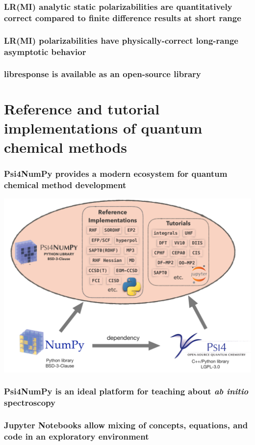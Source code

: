 \documentclass[%
    draft,%
    xcolor=usenames,dvipsnames,svgnames%
]{beamer}
\newcommand\pfn{Psi4NumPy}
\begin{document}
\begin{frame}
  \frametitle{LR(MI) analytic static polarizabilities are quantitatively correct compared to finite difference results at short range}
\end{frame}

\begin{frame}
  \frametitle{LR(MI) polarizabilities have physically-correct long-range asymptotic behavior}
\end{frame}

\begin{frame}
  \frametitle{libresponse is available as an open-source library}
\end{frame}

\section{Reference and tutorial implementations of quantum chemical methods}

\begin{frame}
  \frametitle{\pfn{} provides a modern ecosystem for quantum chemical method development}
  \centering
  \includegraphics[width=\linewidth,keepaspectratio]{./figures/psi4numpy_ecosystem2.pdf}
\end{frame}

\begin{frame}
  \frametitle{\pfn{} is an ideal platform for teaching about \textit{ab initio} spectroscopy}
\end{frame}

\begin{frame}
  \frametitle{Jupyter Notebooks allow mixing of concepts, equations, and code in an exploratory environment}
\end{frame}
\end{document}
